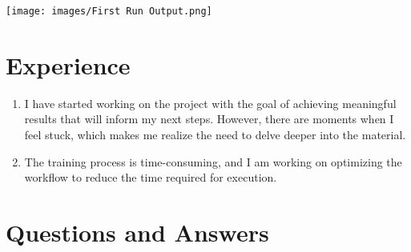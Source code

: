 ﻿\documentclass{article}
\begin{document}
\begin{center}
    \texttt{[image: images/First Run Output.png]}
\end{center}

\section*{Experience}

\begin{enumerate}
    \item I have started working on the project with the goal of achieving meaningful results that will inform my next steps. However, there are moments when I feel stuck, which makes me realize the need to delve deeper into the material.
    
    \item The training process is time-consuming, and I am working on optimizing the workflow to reduce the time required for execution.
\end{enumerate}

\section{Questions and Answers}
\end{document}
